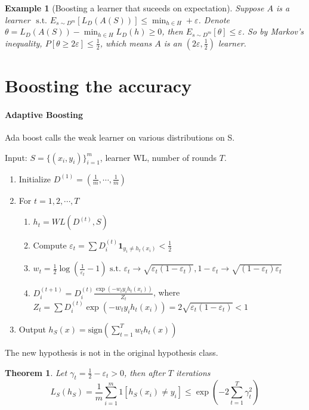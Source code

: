 \documentclass{book}
\newcommand{\st}{\text{ s.t. }}
\newtheorem{Thm}{Theorem}[section]
\newtheorem{Eg}{Example}[section]
\begin{document}
\begin{Eg}[Boosting a learner that suceeds on expectation]
  Suppose $A$ is a learner $\st E_{s\sim D^{m}}[L_{D}(A(S))]\leq \min_{h\in H}+\varepsilon$. Denote $\theta=L_{D}(A(S))-\min_{h\in H} L_{D}(h)\geq 0$, then $E_{s\sim D^{m}}[\theta]\leq \varepsilon$. So by Markov's inequality, $P[\theta\geq 2\varepsilon]\leq \frac{1}{2}$, which means $A$ is an $(2\varepsilon,\frac{1}{2})$ learner.
\end{Eg}

\section{Boosting the accuracy}

\paragraph{Adaptive Boosting}
Ada boost calls the weak learner on various distributions on S.

Input: $S=\{(x_{i},y_{i})\}_{i=1}^{m}$, learner WL, number of rounds $T$.
\begin{enumerate}
\item Initialize $D^{(1)}=(\frac{1}{m},\cdots,\frac{1}{m})$
\item For $t=1,2,\cdots,T$
  \begin{enumerate}
  \item $h_{t}=WL(D^{(t)},S)$
  \item Compute $\varepsilon_{t}=\sum D_{i}^{(t)}\bm{1}_{y_{i}\neq h_{t}(x_{i})}<\frac{1}{2}$
  \item $w_{t}=\frac{1}{2}\log(\frac{1}{\varepsilon_{t}}-1)\st \varepsilon_{t}\to \sqrt{\varepsilon_{t}(1-\varepsilon_{t})},1-\varepsilon_{t}\to \sqrt{(1-\varepsilon_{t})\varepsilon_{t}}$
  \item $D_{i}^{(t+1)}=D_{i}^{(t)}\frac{\exp(-w_{t}y_{i}h_{t}(x_{i}))}{Z_{t}}$, where $Z_{t}=\sum D_{i}^{(t)}\exp(-w_{t}y_{i}h_{t}(x_{i}))=2\sqrt{\varepsilon_{t}(1-\varepsilon_{t})}<1$
  \end{enumerate}
  
\item Output $h_{S}(x)=\mathrm{sign}(\sum_{t=1}^{T}w_{t}h_{t}(x))$
\end{enumerate}

The new hypothesis is not in the original hypothesis class.

\begin{Thm}
  Let $\gamma_{t}=\frac{1}{2}-\varepsilon_{t}>0$, then after $T$ iterations
  \[L_{S}(h_{S})=\frac{1}{m}\sum_{i=1}^{m}1[h_{S}(x_{i})\neq y_{i}]\leq \exp(-2\sum_{t=1}^{T}\gamma_{t}^{2})\]
\end{Thm}
\end{document}
